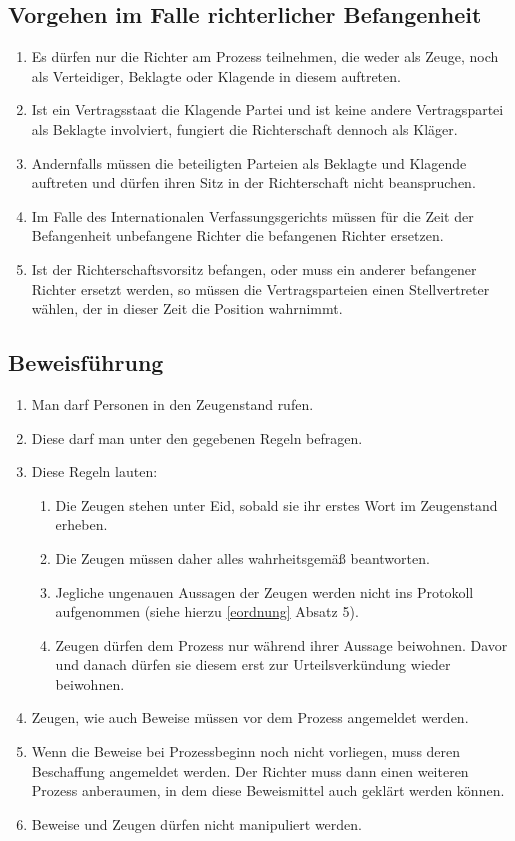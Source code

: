\documentclass{article}
\begin{document}
\subsection{Vorgehen im Falle richterlicher Befangenheit}
\begin{enumerate}[(1)]
    \item Es dürfen nur die Richter am Prozess teilnehmen, die weder als Zeuge, noch als Verteidiger, Beklagte oder Klagende in diesem auftreten.
    \item Ist ein Vertragsstaat die Klagende Partei und ist keine andere Vertragspartei als Beklagte involviert, fungiert die Richterschaft dennoch als Kläger.
    \item Andernfalls müssen die beteiligten Parteien als Beklagte und Klagende auftreten und dürfen ihren Sitz in der Richterschaft nicht beanspruchen.
    \item Im Falle des Internationalen Verfassungsgerichts müssen für die Zeit der Befangenheit unbefangene Richter die befangenen Richter ersetzen.
    \item Ist der Richterschaftsvorsitz befangen, oder muss ein anderer befangener Richter ersetzt werden, so müssen die Vertragsparteien einen Stellvertreter wählen, der in dieser Zeit die Position wahrnimmt.
\end{enumerate}

\subsection{Beweisführung}\label{zeugen}
\begin{enumerate}[(1)]
    \item Man darf Personen in den Zeugenstand rufen.
    \item Diese darf man unter den gegebenen Regeln befragen.
    \item Diese Regeln lauten:
        \begin{enumerate}[1.]
            \item Die Zeugen stehen unter Eid, sobald sie ihr erstes Wort im Zeugenstand erheben.
            \item Die Zeugen müssen daher alles wahrheitsgemäß beantworten.
            \item Jegliche ungenauen Aussagen der Zeugen werden nicht ins Protokoll aufgenommen (siehe hierzu \ref{eordnung} Absatz 5).
            \item Zeugen dürfen dem Prozess nur während ihrer Aussage beiwohnen. Davor und danach dürfen sie diesem erst zur Urteilsverkündung wieder beiwohnen.
        \end{enumerate}
    \item Zeugen, wie auch Beweise müssen vor dem Prozess angemeldet werden.
    \item Wenn die Beweise bei Prozessbeginn noch nicht vorliegen, muss deren Beschaffung angemeldet werden. Der Richter muss dann einen weiteren Prozess anberaumen, in dem diese Beweismittel auch geklärt werden können.
    \item Beweise und Zeugen dürfen nicht manipuliert werden.
\end{enumerate}
\end{document}
